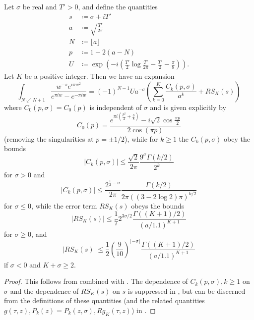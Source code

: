 \begin{proposition}\label{arias-prop}  Let $\sigma$ be real and $T'>0$, and define the quantities
\begin{align}
s &\coloneqq \sigma + iT' \label{s-def}\\
a &\coloneqq \sqrt{\frac{T'}{2\pi}} \label{a-def}\\
N &\coloneqq \lfloor a \rfloor \label{N-def}\\
p &\coloneqq 1 - 2(a-N) \label{p-def}\\
U &\coloneqq \exp( -i(\frac{T'}{2} \log \frac{T'}{2\pi} - \frac{T'}{2} - \frac{\pi}{8}) )\label{U-def}.
\end{align}
Let $K$ be a positive integer.  Then we have an expansion
$$ \int_{N \swarrow N+1} \frac{w^{-s} e^{i\pi w^2}}{e^{\pi i w} - e^{-\pi i w}} = (-1)^{N-1} U a^{-\sigma} (\sum_{k=0}^K \frac{C_k(p,\sigma)}{a^k} + RS_K(s)) $$
where $C_0(p,\sigma) = C_0(p)$ is independent of $\sigma$ and is given explicitly by
\begin{equation}\label{C0-def}
C_0(p)= \frac{e^{\pi i (\frac{p^2}{2} +\frac{3}{8})} - i \sqrt{2} \cos \frac{\pi p}{2}}{2 \cos(\pi p)}
\end{equation}
(removing the singularities at $p = \pm 1/2$), while for $k \geq 1$ the $C_k(p,\sigma)$ obey the bounds
\begin{equation}\label{ck-bound-1}
|C_k(p,\sigma)| \leq \frac{\sqrt{2}}{2\pi} \frac{9^\sigma \Gamma(k/2)}{2^k}
\end{equation}
for $\sigma>0$ and
\begin{equation}\label{ck-bound-2}
|C_k(p,\sigma)| \leq \frac{2^{\frac{1}{2}-\sigma}}{2\pi} \frac{\Gamma(k/2)}{2\pi ((3-2\log 2)\pi)^{k/2}}
\end{equation}
for $\sigma \leq 0$, while the error term $RS_K(s)$ obeys the bounds
\begin{equation}\label{rsk-bound-1}
|RS_K(s)| \leq \frac{1}{7} 2^{3\sigma/2} \frac{\Gamma((K+1)/2)}{(a/1.1)^{K+1}}
\end{equation}
for $\sigma \geq 0$, and
\begin{equation}\label{rsk-bound-2}
|RS_K(s)| \leq \frac{1}{2} (\frac{9}{10})^{\lceil -\sigma \rceil} \frac{\Gamma((K+1)/2)}{(a/1.1)^{K+1}}
\end{equation}
if $\sigma < 0$ and $K + \sigma \geq 2$.
\end{proposition}

\begin{proof} This follows from \cite[Theorems 3.1, 4.1, 4.2]{arias} combined with \cite[(3.2), (5.2)]{arias}.  The dependence of $C_k(p,\sigma), k \geq 1$ on $\sigma$ and the dependence of $RS_K(s)$ on $s$ is suppressed in \cite{arias}, but can be discerned from the definitions of these quantities (and the related quantities $g(\tau,z), P_k(z) = P_k(z,\sigma), Rg_K(\tau,z)$) in \cite[(3.9), (3.10), (3.7), (3.6)]{arias}.
\end{proof}

